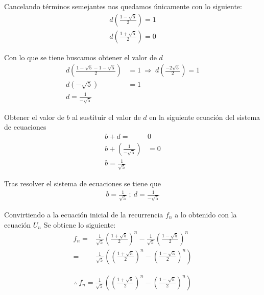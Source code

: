 \documentclass[letterpaper,11pt]{article}
\begin{document}
Cancelando términos semejantes nos quedamos únicamente con lo siguiente:
\begin{equation*}
\begin{aligned}
	d(\frac{1 - \sqrt{5}}{2}) = 1\\
	d(\frac{1 + \sqrt{5}}{2}) = 0
\end{aligned}
\end{equation*}

Con lo que se tiene buscamos obtener el valor de $d$
\begin{equation*}
\begin{aligned}
	d(\frac{1 - \sqrt{5} -1 - \sqrt{5}}{2}) &= 1 \ \Rightarrow \ d(\frac{-2\sqrt{5}}{2}) = 1 \\
	d(-\sqrt{5}) &= 1 \\ d = \frac{1}{-\sqrt{5}}
\end{aligned}
\end{equation*}
\newpage

Obtener el valor de $b$ al sustituir el valor de $d$ en la siguiente ecuación del sistema de ecuaciones 
\begin{equation*}
\begin{aligned}
	b + d =& 0 \\
	b + (\frac{1}{-\sqrt{5}}) &= 0 \\
	 b = \frac{1}{\sqrt{5}}
\end{aligned}
\end{equation*}

Tras resolver el sistema de ecuaciones se tiene que
\begin{equation*}
	\begin{aligned}
		b = \frac{1}{\sqrt{5}} \ ; \ d = \frac{1}{-\sqrt{5}}
	\end{aligned}
\end{equation*}

Convirtiendo a la ecuación inicial de la recurrencia $f_{n}$ a lo obtenido con la ecuación $U_{n}$ \smallbreak
Se obtiene lo siguiente:
\begin{equation*}
\begin{aligned}
	f_{n} =& \frac{1}{\sqrt{5}} (\frac{1 + \sqrt{5}}{2})^{n} - \frac{1}{\sqrt{5}} (\frac{1 - \sqrt{5}}{2})^{n} \\
	=& \frac{1}{\sqrt{5}} ((\frac{1 + \sqrt{5}}{2})^{n} - (\frac{1 - \sqrt{5}}{2})^{n})
\end{aligned}
\end{equation*}

\begin{equation*}
\begin{aligned}
	\therefore \ f_{n} = \frac{1}{\sqrt{5}} ((\frac{1 + \sqrt{5}}{2})^{n} - (\frac{1 - \sqrt{5}}{2})^{n})
\end{aligned}
\end{equation*}
\end{document}
